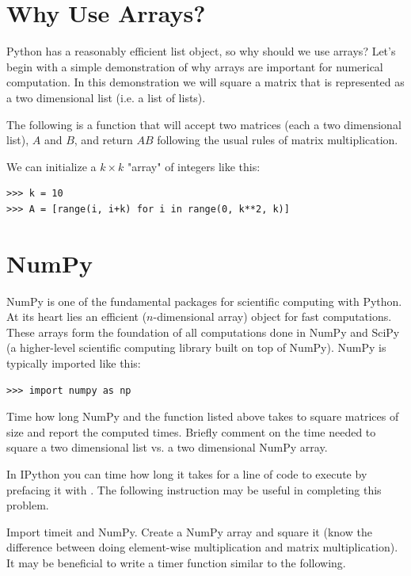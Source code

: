 \label{lab:NumPyArrays}

\section*{Why Use Arrays?} Python has a reasonably efficient list object, 
so why should we use arrays? Let's begin with a simple demonstration of why
arrays are important for numerical computation. In this demonstration 
we will square a matrix that is represented as a two dimensional list 
(i.e. a list of lists).

The following is a function that will accept two matrices (each a two
dimensional list), $A$ and $B$, and return $AB$ following the usual rules
of matrix multiplication. 



We can initialize a $k \times k$ "array" of integers like this:
\begin{lstlisting}
>>> k = 10 
>>> A = [range(i, i+k) for i in range(0, k**2, k)]
\end{lstlisting}

\section*{NumPy} NumPy is one of the fundamental packages for scientific
computing with Python. At its heart lies an efficient 
($n$-dimensional array) object for fast computations. These arrays form
the foundation of all computations done in NumPy and SciPy (a
higher-level scientific computing library built on top of NumPy). NumPy
is typically imported like this: 

\begin{lstlisting}
>>> import numpy as np
\end{lstlisting}

\begin{problem} 
Time how long NumPy and the  function 
listed above takes to square matrices of size  
and report the computed times. Briefly comment on the time needed to 
square a two dimensional list vs. a two dimensional NumPy array.

In IPython you can time how long it takes for a line of code to execute
by prefacing it with . The following instruction 
may be useful in completing this problem.

Import timeit and NumPy. Create a NumPy array and square it 
(know the difference between doing element-wise multiplication 
and matrix multiplication).
It may be beneficial to write a timer function similar to the following.


\end{problem}

